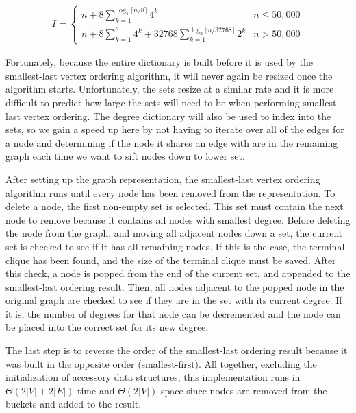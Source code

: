 \documentclass{article}
\begin{document}
        \begin{align}
            I =
            \begin{cases}
                n + 8\sum_{k=1}^{\log_4\lceil n/8\rceil}4^k & n \leq 50,000 \\
                n + 8\sum_{k=1}^{6}4^k + 32768\sum_{k=1}^{\log_2\lceil n/32768\rceil}2^k & n > 50,000
            \end{cases}
        \end{align}

        Fortunately, because the entire dictionary is built before it is used by the smallest-last vertex ordering algorithm, it will never again be resized once the algorithm starts. Unfortunately, the sets resize at a similar rate and it is more difficult to predict how large the sets will need to be when performing smallest-last vertex ordering. The degree dictionary will also be used to index into the sets, so we gain a speed up here by not having to iterate over all of the edges for a node and determining if the node it shares an edge with are in the remaining graph each time we want to sift nodes down to lower set.
        \par
        After setting up the graph representation, the smallest-last vertex ordering algorithm runs until every node has been removed from the representation. To delete a node, the first non-empty set is selected. This set must contain the next node to remove because it contains all nodes with smallest degree. Before deleting the node from the graph, and moving all adjacent nodes down a set, the current set is checked to see if it has all remaining nodes. If this is the case, the terminal clique has been found, and the size of the terminal clique must be saved. After this check, a node is popped from the end of the current set, and appended to the smallest-last ordering result. Then, all nodes adjacent to the popped node in the original graph are checked to see if they are in the set with its current degree. If it is, the number of degrees for that node can be decremented and the node can be placed into the correct set for its new degree.
        \par
        The last step is to reverse the order of the smallest-last ordering result because it was built in the opposite order (smallest-first). All together, excluding the initialization of accessory data structures, this implementation runs in $\Theta(2|V| + 2|E|)$ time and $\Theta(2|V|)$ space since nodes are removed from the buckets and added to the result.
        \par
\end{document}
